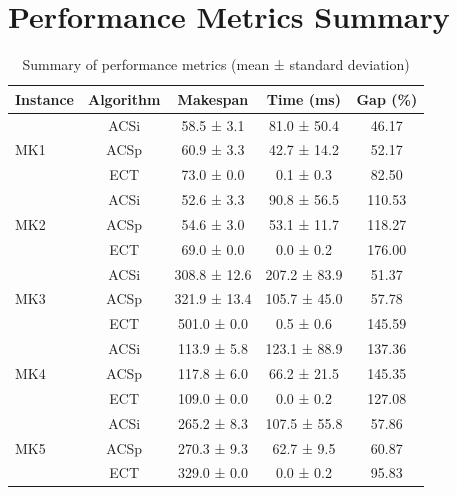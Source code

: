 \documentclass[10pt]{article}
\begin{document}
\section{Performance Metrics Summary}
\begin{table}[H]
\centering
\caption{Summary of performance metrics (mean ± standard deviation)}
\label{tab:metrics}
\begin{tabular}{lcccc}
\toprule
Instance & Algorithm & Makespan & Time (ms) & Gap (\%) \\
\midrule
\multirow{3}{*}{MK1} & ACSi & 58.5 ± 3.1 & 81.0 ± 50.4 & 46.17 \\
 & ACSp & 60.9 ± 3.3 & 42.7 ± 14.2 & 52.17 \\
 & ECT & 73.0 ± 0.0 & 0.1 ± 0.3 & 82.50 \\
\midrule
\multirow{3}{*}{MK2} & ACSi & 52.6 ± 3.3 & 90.8 ± 56.5 & 110.53 \\
 & ACSp & 54.6 ± 3.0 & 53.1 ± 11.7 & 118.27 \\
 & ECT & 69.0 ± 0.0 & 0.0 ± 0.2 & 176.00 \\
\midrule
\multirow{3}{*}{MK3} & ACSi & 308.8 ± 12.6 & 207.2 ± 83.9 & 51.37 \\
 & ACSp & 321.9 ± 13.4 & 105.7 ± 45.0 & 57.78 \\
 & ECT & 501.0 ± 0.0 & 0.5 ± 0.6 & 145.59 \\
\midrule
\multirow{3}{*}{MK4} & ACSi & 113.9 ± 5.8 & 123.1 ± 88.9 & 137.36 \\
 & ACSp & 117.8 ± 6.0 & 66.2 ± 21.5 & 145.35 \\
 & ECT & 109.0 ± 0.0 & 0.0 ± 0.2 & 127.08 \\
\midrule
\multirow{3}{*}{MK5} & ACSi & 265.2 ± 8.3 & 107.5 ± 55.8 & 57.86 \\
 & ACSp & 270.3 ± 9.3 & 62.7 ± 9.5 & 60.87 \\
 & ECT & 329.0 ± 0.0 & 0.0 ± 0.2 & 95.83 \\
\midrule
\bottomrule
\end{tabular}
\end{table}
\end{document}
